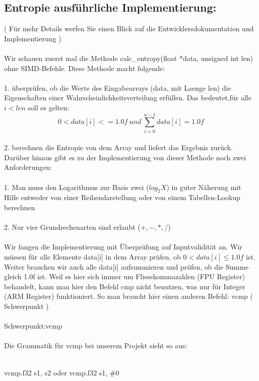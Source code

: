 \documentclass[11pt]{article}
\begin{document}
{{{\subsection{Entropie ausf\"uhrliche Implementierung:}
( F\"ur mehr Details werfen Sie einen Blick auf die Entwicklersdokumentation und Implementierung )\\\\
Wir schauen zuerst mal die Methode calc\_entropy(float *data, unsigned int len) ohne SIMD-Befehle. Diese Methode macht folgende:\\\\
{\Large 1.} \"uberpr\"ufen, ob die Werte des Eingabearrays (data, mit Laenge len) die Eigenschaften einer Wahrscheinlichkeitsverteilung erf\"ullen. Das bedeutet,f\"ur alle $i < len$ soll es gelten:  $$0<data[i]<=1.0f \  und \  \sum_{i=0}^{n-1} data[i] = 1.0f$$\\
{\Large 2.} berechnen die Entropie von dem Array und liefert das Ergebnis zur\"uck. \\
Dar\"uber hinaus gibt es zu der Implementierung von dieser Methode noch zwei Anforderungen:\\\\
{\Large 1.}	Man muss den Logarithmus zur Basis zwei ($log_2{X}$) in guter N\"aherung mit Hilfe entweder von einer Reihendarstellung oder von einem Tabellen-Lookup berechnen\\\\
{\Large 2.} Nur vier Grundrechenarten sind erlaubt ($+, -, *, /$)\\\\
Wir fangen die Implementierung mit \"Uberpr\"ufung auf Inputvalidit\"at an. Wir m\"ussen f\"ur alle Elemente data[i] in dem Array pr\"ufen, ob $0 < data[i] ≤ 1.0f$ ist. Weiter brauchen wir auch alle data[i] aufsummieren und pr\"ufen, ob die Summe gleich 1.0f ist. Weil es hier sich immer um Fliesskommazahlen (FPU Register) behandelt, kann man hier den Befehl cmp nicht benutzen, was nur f\"ur Integer (ARM Register) funktioniert. So man braucht hier einen anderen Befehl: vcmp ({\color{red} Schwerpunkt })\\\\
{\color{red} Schwerpunkt:vcmp }\\\\
Die Grammatik f\"ur vcmp bei unserem Projekt sieht so aus:\\\\
\centerline{vcmp.f32 s1, s2	oder vcmp.f32 s1, \#0}\\\\
}}}
\end{document}
